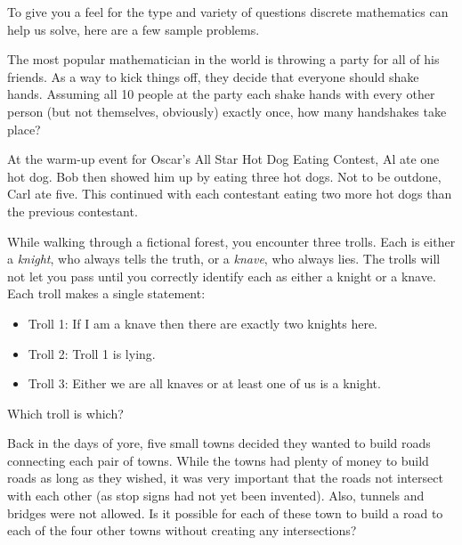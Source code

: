 \documentclass[11pt]{exam}
\begin{document}
To give you a feel for the type and variety of questions discrete mathematics can help us solve, here are a few sample problems.
\begin{questions}

\question The most popular mathematician in the world is throwing a party for all of his friends.  As a way to kick things off, they decide that everyone should shake hands.  Assuming all 10 people at the party each shake hands with every other person (but not themselves, obviously) exactly once, how many handshakes take place?
  
  \question At the warm-up event for Oscar's All Star Hot Dog Eating Contest, Al ate one hot dog.  Bob then showed him up by eating three hot dogs.  Not to be outdone, Carl ate five.  This continued with each contestant eating two more hot dogs than the previous contestant.

  \question While walking through a fictional forest, you encounter three trolls.  Each is either a {\em knight}, who always tells the truth, or a {\em knave}, who always lies.  The trolls will not let you pass until you correctly identify each as either a knight or a knave.  Each troll makes a single statement:
  \begin{itemize}
   \item[] Troll 1: If I am a knave then there are exactly two knights here. 
   \item[] Troll 2: Troll 1 is lying.
   \item[] Troll 3: Either we are all knaves or at least one of us is a knight.
  \end{itemize}
  Which troll is which?  %
  
  \question Back in the days of yore, five small towns decided they wanted to build roads connecting each pair of towns. While the towns had plenty of money to build roads as long as they wished, it was very important that the roads not intersect with each other (as stop signs had not yet been invented). Also, tunnels and bridges were not allowed. Is it possible for each of these town to build a road to each of the four other towns without creating any intersections? 
  

\end{questions}
\end{document}
